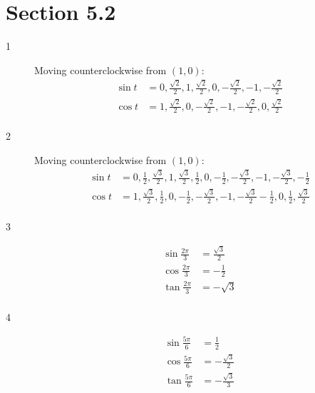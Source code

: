 \documentclass{exam}
\begin{document}
    \section{Section 5.2}
    \begin{description}

      \item[1]
        Moving counterclockwise from $(1, 0)$:
        \begin{align*}
          \sin t &= 0, \frac{\sqrt{2}}{2}, 1, \frac{\sqrt{2}}{2}, 0, - \frac{\sqrt{2}}{2}, -1, - \frac{\sqrt{2}}{2} \\
          \cos t &= 1, \frac{\sqrt{2}}{2}, 0, - \frac{\sqrt{2}}{2}, -1, - \frac{\sqrt{2}}{2}, 0, \frac{\sqrt{2}}{2} \\
        \end{align*}

      \item[2]
        Moving counterclockwise from $(1, 0)$:
        \begin{align*}
          \sin t &= 0, \frac{1}{2}, \frac{\sqrt{3}}{2}, 1, \frac{\sqrt{3}}{2}, \frac{1}{2}, 0, -\frac{1}{2},
            -\frac{\sqrt{3}}{2}, -1, - \frac{\sqrt{3}}{2}, - \frac{1}{2} \\
          \cos t &= 1, \frac{\sqrt{3}}{2}, \frac{1}{2}, 0, - \frac{1}{2}, - \frac{\sqrt{3}}{2}, -1, - \frac{\sqrt{3}}{2}
              -\frac{1}{2}, 0, \frac{1}{2}, \frac{\sqrt{3}}{2} \\
        \end{align*}

      \item[3]
        \begin{align*}
          \sin \frac{2 \pi}{3} & = \boxed{ \frac{\sqrt{3}}{2} } \\
          \cos \frac{2 \pi}{3} & = \boxed{ - \frac{1}{2} } \\
          \tan \frac{2 \pi}{3} & = \boxed{ - \sqrt{3} } \\
        \end{align*}

      \item[4]
        \begin{align*}
          \sin \frac{5 \pi}{6} &= \boxed{ \frac{1}{2} } \\
          \cos \frac{5 \pi}{6} &= \boxed{ - \frac{\sqrt{3}}{2} } \\
          \tan \frac{5 \pi}{6} &= \boxed{ - \frac{\sqrt{3}}{3} } \\
        \end{align*}


\end{description}
\end{document}
